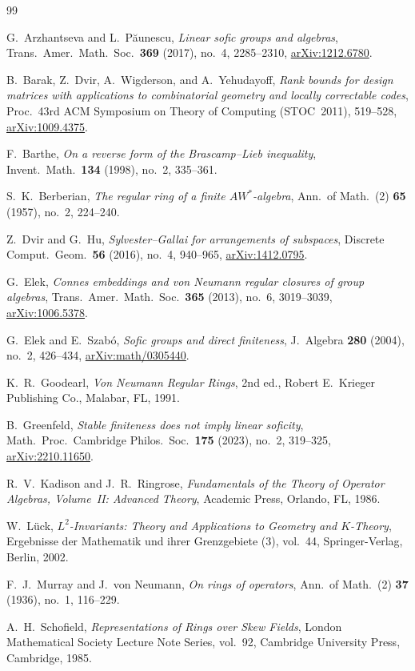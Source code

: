 \documentclass[11pt]{article}
\theoremstyle{definition}
\theoremstyle{remark}
\numberwithin{equation}{section}
\newcommand{\1}{\mathbf{1}}
\begin{document}
\begin{thebibliography}{99}

G.~Arzhantseva and L.~P\u{a}unescu,
\emph{Linear sofic groups and algebras},
Trans.\ Amer.\ Math.\ Soc.\ \textbf{369} (2017), no.~4, 2285--2310,
\href{https://arxiv.org/abs/1212.6780}{arXiv:1212.6780}.

B.~Barak, Z.~Dvir, A.~Wigderson, and A.~Yehudayoff,
\emph{Rank bounds for design matrices with applications to combinatorial geometry and locally correctable codes},
Proc.\ 43rd ACM Symposium on Theory of Computing (STOC~2011), 519--528,
\href{https://arxiv.org/abs/1009.4375}{arXiv:1009.4375}.

F.~Barthe,
\emph{On a reverse form of the Brascamp--Lieb inequality},
Invent.\ Math.\ \textbf{134} (1998), no.~2, 335--361.

S.~K.~Berberian,
\emph{The regular ring of a finite $AW^*$-algebra},
Ann.\ of Math.\ (2) \textbf{65} (1957), no.~2, 224--240.

Z.~Dvir and G.~Hu,
\emph{Sylvester--Gallai for arrangements of subspaces},
Discrete Comput.\ Geom.\ \textbf{56} (2016), no.~4, 940--965,
\href{https://arxiv.org/abs/1412.0795}{arXiv:1412.0795}.

G.~Elek,
\emph{Connes embeddings and von Neumann regular closures of group algebras},
Trans.\ Amer.\ Math.\ Soc.\ \textbf{365} (2013), no.~6, 3019--3039,
\href{https://arxiv.org/abs/1006.5378}{arXiv:1006.5378}.

G.~Elek and E.~Szab\'o,
\emph{Sofic groups and direct finiteness},
J.\ Algebra \textbf{280} (2004), no.~2, 426--434,
\href{https://arxiv.org/abs/math/0305440}{arXiv:math/0305440}.

K.~R.~Goodearl,
\emph{Von Neumann Regular Rings},
2nd ed., Robert E.\ Krieger Publishing Co., Malabar, FL, 1991.

B.~Greenfeld,
\emph{Stable finiteness does not imply linear soficity},
Math.\ Proc.\ Cambridge Philos.\ Soc.\ \textbf{175} (2023), no.~2, 319--325,
\href{https://arxiv.org/abs/2210.11650}{arXiv:2210.11650}.

R.~V.~Kadison and J.~R.~Ringrose,
\emph{Fundamentals of the Theory of Operator Algebras, Volume~II: Advanced Theory},
Academic Press, Orlando, FL, 1986.

W.~L\"uck,
\emph{$L^2$-Invariants: Theory and Applications to Geometry and $K$-Theory},
Ergebnisse der Mathematik und ihrer Grenzgebiete (3), vol.~44, Springer-Verlag, Berlin, 2002.

F.~J.~Murray and J.~von Neumann,
\emph{On rings of operators},
Ann.\ of Math.\ (2) \textbf{37} (1936), no.~1, 116--229.

A.~H.~Schofield,
\emph{Representations of Rings over Skew Fields},
London Mathematical Society Lecture Note Series, vol.~92, Cambridge University Press, Cambridge, 1985.

\end{thebibliography}
\end{document}
